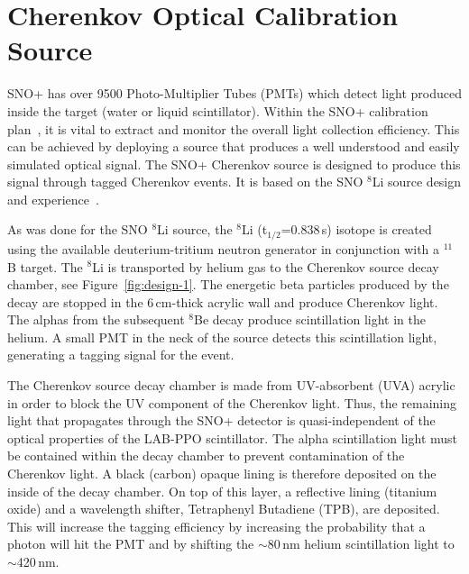 \newcommand{\Li}{$^{8}$Li }
\renewcommand{\bf}{\bfseries}

\chapter{Cherenkov Optical Calibration Source}

\label{chap:execsummary}

SNO+ has over 9500 Photo-Multiplier Tubes (PMTs) which detect light produced inside the target (water or liquid scintillator). Within the SNO+ calibration plan~\cite{gann:2013}, it is vital to extract and monitor the overall light collection efficiency. This can be achieved by deploying a source that produces a well understood and easily simulated optical signal. The SNO+ Cherenkov source is designed to produce this signal through tagged Cherenkov events. It is based on the SNO \Li source design and experience~\cite{Tagg:2002,Tagg:2001}.


As was done for the SNO \Li source, the \Li (t$_{1/2}$=0.838\,s) isotope is created using the available deuterium-tritium neutron generator in conjunction with a $^{11}$B target. The \Li is transported by helium gas to the Cherenkov source decay chamber, see Figure~\ref{fig:design-1}. The energetic beta particles produced by the decay are stopped in the 6\,cm-thick acrylic wall and produce Cherenkov light. The alphas from the subsequent $^{8}$Be decay produce scintillation light in the helium. A small PMT in the neck of the source detects this scintillation light, generating a tagging signal for the event. 

The Cherenkov source decay chamber is made from UV-absorbent (UVA) acrylic in order to block the UV component of the Cherenkov light. Thus, the remaining light that propagates through the SNO+ detector is quasi-independent of the optical properties of the LAB-PPO scintillator. The alpha scintillation light must be contained within the decay chamber to prevent contamination of the Cherenkov light. A black (carbon) opaque lining is therefore deposited on the inside of the decay chamber. On top of this layer, a reflective lining (titanium oxide) and a wavelength shifter, Tetraphenyl Butadiene (TPB), are deposited. This will increase the tagging efficiency by increasing the probability that a photon will hit the PMT and by shifting the  $\sim$80\,nm helium scintillation light to $\sim$420\,nm.


